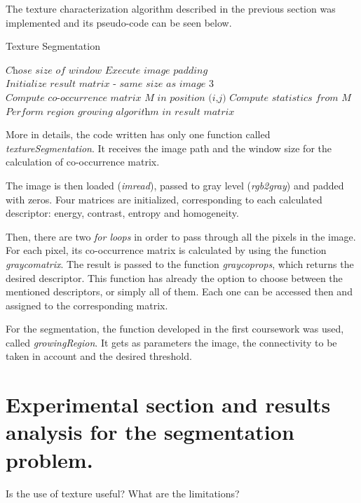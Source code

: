 \documentclass{article}
\begin{document}
The texture characterization algorithm described in the previous section was implemented and its pseudo-code can be seen below.

\begin{algorithm}
\caption{Texture Segmentation}
\begin{algorithmic} 
\STATE $\textit{Chose size of window}$
\STATE $\textit{Execute image padding}$
\STATE $\textit{Initialize result matrix - same size as image 3}$
\STATE $\textit{Compute co-occurrence matrix M in position (i,j)}$
\STATE $\textit{Compute statistics from M}$
\ENDFOR
\STATE $\textit{Perform region growing algorithm in result matrix}$
\end{algorithmic}
\end{algorithm}

More in details, the code written has only one function called \textit{textureSegmentation}. It receives the image path and the window size for the calculation of co-occurrence matrix.

The image is then loaded (\textit{imread}), passed to gray level (\textit{rgb2gray}) and padded with zeros. Four matrices are initialized, corresponding to each calculated descriptor: energy, contrast, entropy and homogeneity.

Then, there are two \textit{for loops} in order to pass through all the pixels in the image. For each pixel, its co-occurrence matrix is calculated by using the function \textit{graycomatrix}. The result is passed to the function \textit{graycoprops}, which returns the desired descriptor. This function has already the option to choose between the mentioned descriptors, or simply all of them. Each one can be accessed then and assigned to the corresponding matrix.

For the segmentation, the function developed in the first coursework was used, called \textit{growingRegion}. It gets as parameters the image, the connectivity to be taken in account and the desired threshold.


\section{Experimental section and results analysis for the segmentation problem.}


Is the use of texture useful? What are the limitations?

\end{document}
